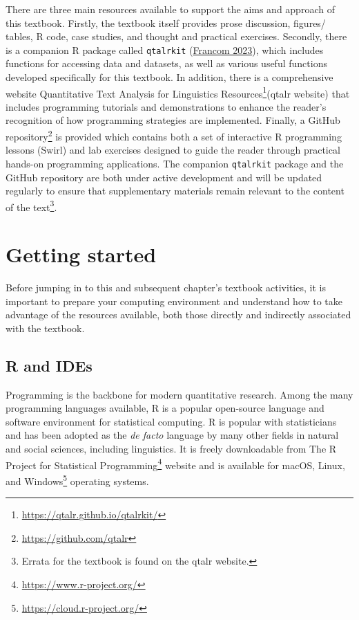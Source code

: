 \documentclass[
  letterpaper,
  DIV=11,
  numbers=noendperiod]{scrreport}
\theoremstyle{definition}
\theoremstyle{remark}
\DeclareRobustCommand{\href}[2]{#2\footnote{\url{#1}}}
\begin{document}

There are three main resources available to support the aims and
approach of this textbook. Firstly, the textbook itself provides prose
discussion, figures/ tables, R code, case studies, and thought and
practical exercises. Secondly, there is a companion R package called
\texttt{qtalrkit} (\protect\hyperlink{ref-R-qtalrkit}{Francom 2023}),
which includes functions for accessing data and datasets, as well as
various useful functions developed specifically for this textbook. In
addition, there is a comprehensive website
\href{https://qtalr.github.io/qtalrkit/}{Quantitative Text Analysis for
Linguistics Resources}(qtalr website) that includes programming
tutorials and demonstrations to enhance the reader's recognition of how
programming strategies are implemented. Finally, a
\href{https://github.com/qtalr}{GitHub repository} is provided which
contains both a set of interactive R programming lessons (Swirl) and lab
exercises designed to guide the reader through practical hands-on
programming applications. The companion \texttt{qtalrkit} package and
the GitHub repository are both under active development and will be
updated regularly to ensure that supplementary materials remain relevant
to the content of the text\footnote{Errata for the textbook is found on
  the qtalr website.}.

\hypertarget{sec-p-getting-started}{%
\section*{Getting started}\label{sec-p-getting-started}}


Before jumping in to this and subsequent chapter's textbook activities,
it is important to prepare your computing environment and understand how
to take advantage of the resources available, both those directly and
indirectly associated with the textbook.

\hypertarget{sec-p-r-ides}{%
\subsection*{R and IDEs}\label{sec-p-r-ides}}

Programming is the backbone for modern quantitative research. Among the
many programming languages available, R is a popular open-source
language and software environment for statistical computing. R is
popular with statisticians and has been adopted as the \emph{de facto}
language by many other fields in natural and social sciences, including
linguistics. It is freely downloadable from
\href{https://www.r-project.org/}{The R Project for Statistical
Programming} website and is available for
\href{https://cloud.r-project.org/}{macOS, Linux, and Windows} operating
systems.
\end{document}
